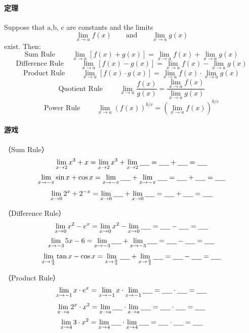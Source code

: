 \documentclass[UTF8]{ctexart}
\begin{document}
\paragraph{定理}
Suppose that a,b, c are constants and the limits
\[{\lim_{x \to a} f(x)} \qquad \text{and} \qquad {\lim_{x \to a} g(x)}\]
exist. Then:
\[\text{Sum Rule }\qquad {\lim_{x \to a} [f(x) + g(x)]} = {\lim_{x \to a} f(x)}+{\lim_{x \to a} g(x)}\]
\[\text{Difference Rule }\qquad {\lim_{x \to a} [f(x) - g(x)]} = {\lim_{x \to a} f(x)}-{\lim_{x \to a} g(x)}\]
\[\text{Product Rule }\qquad {\lim_{x \to a} [f(x) \cdot g(x)]} = {\lim_{x \to a} f(x)} \cdot {\lim_{x \to a} g(x)}\]
\[\text{Quotient Rule }\qquad {\lim_{x \to a} \frac{f(x)}{g(x)}} =\frac{{\lim_{x \to a} f(x)}}{{\lim_{x \to a} g(x)}}\]
\[\text{Power Rule }\qquad {\lim_{x \to a} (f(x))^{b/c}} = ({\lim_{x \to a} f(x)})^{b/c}\]

\paragraph{游戏}

（Sum Rule）
\[ {\lim_{x \to 2} x^3 + x} = {\lim_{x \to 2} x^3} + {\lim_{x \to 2} \underline{\hbox to 5mm{}}} =  \underline{\hbox to 5mm{}} + \underline{\hbox to 5mm{}} =  \underline{\hbox to 5mm{}}\]
\[ {\lim_{x \to -\pi} \sin{x} + \cos{x}} = {\lim_{x \to -\pi} \underline{\hbox to 5mm{}}} + {\lim_{x \to -\pi} \underline{\hbox to 5mm{}}} =  \underline{\hbox to 5mm{}} + \underline{\hbox to 5mm{}} =  \underline{\hbox to 5mm{}}\]
\[ {\lim_{x \to 0} 2^x + 2^{-x}} = {\lim_{x \to 0} \underline{\hbox to 5mm{}}} + {\lim_{x \to 0} \underline{\hbox to 5mm{}}} =  \underline{\hbox to 5mm{}} + \underline{\hbox to 5mm{}} =  \underline{\hbox to 5mm{}}\]

（Difference Rule）
\[ {\lim_{x \to 0} x^2 - e^x} = {\lim_{x \to 0} x^2} - {\lim_{x \to 0} \underline{\hbox to 5mm{}}} =  \underline{\hbox to 5mm{}} - \underline{\hbox to 5mm{}} =  \underline{\hbox to 5mm{}}\]
\[ {\lim_{x \to -3} 5x - 6} = {\lim_{x \to -3} \underline{\hbox to 5mm{}}} + {\lim_{x \to -3} \underline{\hbox to 5mm{}}} =  \underline{\hbox to 5mm{}} - \underline{\hbox to 5mm{}} =  \underline{\hbox to 5mm{}}\]
\[ {\lim_{x \to \frac{\pi}{4}} \tan{x} - \cos{x}} = {\lim_{x \to \frac{\pi}{4}} \underline{\hbox to 5mm{}}} + {\lim_{x \to \frac{\pi}{4}} \underline{\hbox to 5mm{}}} =  \underline{\hbox to 5mm{}} - \underline{\hbox to 5mm{}} =  \underline{\hbox to 5mm{}}\]

（Product Rule）
\[ {\lim_{x \to -1} x \cdot e^x} = {\lim_{x \to -1} x} \cdot {\lim_{x \to -1} \underline{\hbox to 5mm{}}} =  \underline{\hbox to 5mm{}} \cdot \underline{\hbox to 5mm{}} =  \underline{\hbox to 5mm{}}\]
\[ {\lim_{x \to a} 2^x \cdot x^2 } = {\lim_{x \to a} \underline{\hbox to 5mm{}}} \cdot {\lim_{x \to a} \underline{\hbox to 5mm{}}} =  \underline{\hbox to 5mm{}} \cdot \underline{\hbox to 5mm{}} =  \underline{\hbox to 5mm{}}\]
\[ {\lim_{x \to 4} 3 \cdot x^2} = {\lim_{x \to 4} \underline{\hbox to 5mm{}}} \cdot {\lim_{x \to 4} \underline{\hbox to 5mm{}}} =  \underline{\hbox to 5mm{}} \cdot \underline{\hbox to 5mm{}} =  \underline{\hbox to 5mm{}}\]
\end{document}
